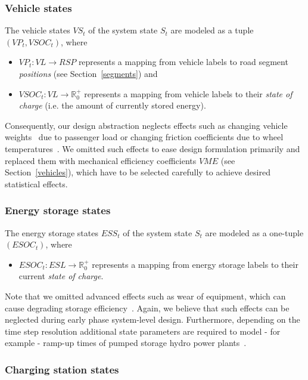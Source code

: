 \subsubsection{Vehicle states}
\label{states_vehicles}

The vehicle states $VS_t$ of the system state $S_t$ are modeled as a tuple $(VP_t, VSOC_t)$, where
\begin{itemize}
	\item $VP_t: VL \rightarrow RSP$ represents a mapping from vehicle labels to road segment \textit{positions} (see Section~\ref{segments}) and
	\item $VSOC_t: VL \rightarrow \mathbb{R}_0^+$ represents a mapping from vehicle labels to their \textit{state of charge} (i.e. the amount of currently stored energy).
\end{itemize}
Consequently, our design abstraction neglects effects such as changing vehicle weights~\cite{?} due to passenger load or changing friction coefficients due to wheel temperatures~\cite{?}. We omitted such effects to ease design formulation primarily and replaced them with mechanical efficiency coefficients $VME$ (see Section~\ref{vehicles}), which have to be selected carefully to achieve desired statistical effects.

\subsubsection{Energy storage states}
\label{states_storages}

The energy storage states $ESS_t$ of the system state $S_t$ are modeled as a one-tuple $(ESOC_t)$, where
\begin{itemize}
	\item $ESOC_t: ESL \rightarrow \mathbb{R}_0^+$ represents a mapping from energy storage labels to their current \textit{state of charge}. 
\end{itemize}
Note that we omitted advanced effects such as wear of equipment, which can cause degrading storage efficiency~\cite{?}. Again, we believe that such effects can be neglected during early phase system-level design. Furthermore, depending on the time step resolution additional state parameters are required to model - for example - ramp-up times of pumped storage hydro power plants~\cite{Garcia2008}.

\subsubsection{Charging station states}
\label{states_stations}

